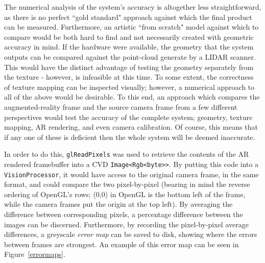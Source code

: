 \documentclass[a4paper,10pt]{report}
\begin{document}
The numerical analysis of the system's accuracy is altogether less straightforward, as there is no perfect ``gold standard" approach against which the final product can be measured. Furthermore, an artistic ``from scratch" model against which to compare would be both hard to find and not necessarily created with geometric accuracy in mind. If the hardware were available, the geometry that the system outputs can be compared against the point-cloud generate by a LIDAR scanner. This would have the distinct advantage of testing the geometry separately from the texture - however, is infeasible at this time. To some extent, the correctness of texture mapping can be inspected visually; however, a numerical approach to all of the above would be desirable. To this end, an approach which compares the augmented-reality frame and the source camera frame from a few different perspectives would test the accuracy of the complete system; geometry, texture mapping, AR rendering, and even camera calibration. Of course, this means that if any one of these is deficient then the whole system will be deemed inaccurate. 

In order to do this, \texttt{glReadPixels} was used to retrieve the contents of the AR rendered framebuffer into a CVD \texttt{Image\textless Rgb\textless byte\textgreater \textgreater}. By putting this code into a \texttt{VisionProcessor}, it would have access to the original camera frame, in the same format, and could compare the two pixel-by-pixel (bearing in mind the reverse ordering of OpenGL's rows; (0,0) in OpenGL is the bottom left of the frame, while the camera frames put the origin at the top left). By averaging the difference between corresponding pixels, a percentage difference between the images can be discerned. Furthermore, by recording the pixel-by-pixel average differences, a greyscale \textit{error map} can be saved to disk, showing where the errors between frames are strongest. An example of this error map can be seen in Figure~\ref{errormaps}.
\end{document}

